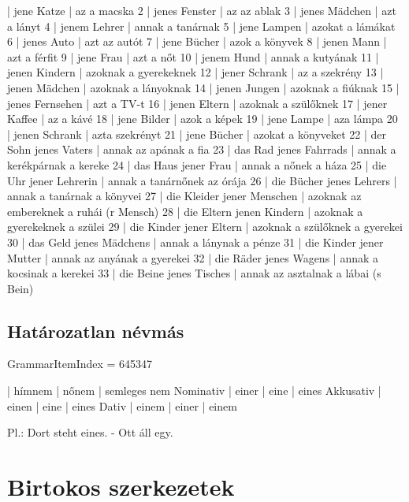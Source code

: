 \documentclass{article}
\newenvironment{desc}{\verbatim}{\endverbatim}
\newenvironment{exmp}{\verbatim}{\endverbatim}
\begin{document}
\begin{exmp}
1 | jene Katze | az a macska
2 | jenes Fenster | az az ablak
3 | jenes Mädchen | azt a lányt
4 | jenem Lehrer | annak a tanárnak
5 | jene Lampen | azokat a lámákat
6 | jenes Auto | azt az autót
7 | jene Bücher | azok a könyvek
8 | jenen Mann | azt a férfit
9 | jene Frau | azt a nőt
10 | jenem Hund | annak a kutyának
11 | jenen Kindern | azoknak a gyerekeknek
12 | jener Schrank | az a szekrény
13 | jenen Mädchen | azoknak a lányoknak
14 | jenen Jungen | azoknak  a fiúknak
15 | jenes Fernsehen | azt a TV-t
16 | jenen Eltern | azoknak a szülőknek
17 | jener Kaffee | az a kávé
18 | jene Bilder | azok a képek
19 | jene Lampe | aza lámpa
20 | jenen Schrank | azta szekrényt
21 | jene Bücher | azokat a könyveket
22 | der Sohn jenes Vaters | annak az apának a fia
23 | das Rad jenes Fahrrads | annak a kerékpárnak a kereke
24 | das Haus jener Frau | annak a nőnek a háza
25 | die Uhr jener Lehrerin | annak a tanárnőnek az órája
26 | die Bücher jenes Lehrers | annak a tanárnak a könyvei
27 | die Kleider jener Menschen | azoknak az embereknek a ruhái (r Mensch)
28 | die Eltern jenen Kindern | azoknak a gyerekeknek a szülei
29 | die Kinder jener Eltern | azoknak a szülőknek a gyerekei
30 | das Geld jenes Mädchens | annak a lánynak a pénze
31 | die Kinder jener Mutter | annak az anyának a gyerekei
32 | die Räder jenes Wagens | annak a kocsinak a kerekei
33 | die Beine jenes Tisches | annak az asztalnak a lábai (s Bein)
\end{exmp}

\subsection{Határozatlan névmás}

GrammarItemIndex = 645347

\begin{desc}
          | hímnem | nőnem | semleges nem 
Nominativ | einer  | eine  | eines 
Akkusativ | einen  | eine  | eines 
Dativ     | einem  | einer | einem 

Pl.: Dort steht eines. - Ott áll egy.
\end{desc}

\begin{exmp}
\end{exmp}

\section{Birtokos szerkezetek}
\end{document}
